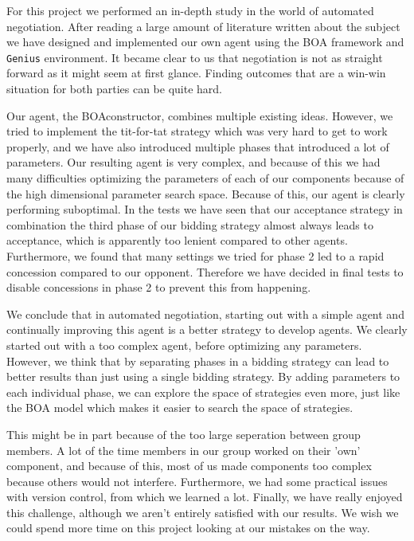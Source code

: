 

For this project we performed an in-depth study in the world of automated negotiation. After reading a large amount of literature written about the subject we have designed and implemented our own agent using the BOA framework and \texttt{Genius} environment. It became clear to us that negotiation is not as straight forward as it might seem at first glance. Finding outcomes that are a win-win situation for both parties can be quite hard.

Our agent, the BOAconstructor, combines multiple existing ideas.
However, we tried to implement the tit-for-tat strategy which was very hard to get to work properly, and we have also introduced multiple phases that introduced a lot of parameters.
Our resulting agent is very complex, and because of this we had many difficulties optimizing the parameters of each of our components because of the high dimensional parameter search space. Because of this, our agent is clearly performing suboptimal.
In the tests we have seen that our acceptance strategy in combination the third phase of our bidding strategy
almost always leads to acceptance, which is apparently too lenient compared to other agents.
Furthermore, we found that many settings we tried for phase 2 led to a rapid concession compared to our opponent. 
Therefore we have decided in final tests to disable concessions in phase 2 to prevent this from happening.

We conclude that in automated negotiation, starting out with a simple agent and 
continually improving this agent is a better strategy to develop agents. 
We clearly started out with a too complex agent, before optimizing any parameters.
However, we think that by separating phases in a bidding strategy can lead to 
better results than just using a single bidding strategy. By adding parameters
to each individual phase, we can explore the space of strategies even more,
just like the BOA model which makes it easier to search the space of strategies.

This might be in part because of the too large seperation between group members.
A lot of the time members in our group worked on their 'own' component, 
and because of this, most of us made components too complex because others would not interfere.
Furthermore, we had some practical issues with version control, from which we learned a lot.
Finally, we have really enjoyed this challenge, although we aren't entirely satisfied with 
our results. We wish we could spend more time on this project looking at our mistakes
on the way.
 
